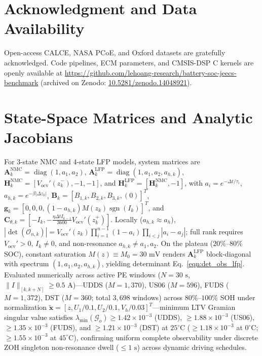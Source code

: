 \documentclass[preprint,12pt]{elsarticle}
\begin{document}
\section*{Acknowledgment and Data Availability}
{\sloppy Open-access CALCE, NASA PCoE, and Oxford datasets are gratefully acknowledged. Code pipelines, ECM parameters, and CMSIS-DSP C kernels are openly available at \url{https://github.com/lehoang-research/battery-soc-jeecs-benchmark} (archived on Zenodo: \href{https://doi.org/10.5281/zenodo.14048921}{10.5281/zenodo.14048921}).\par}

\appendix
\appendix

\section{State-Space Matrices and Analytic Jacobians\label{app:jacobians}}
For 3-state NMC and 4-state LFP models, system matrices are $\mathbf{A}_k^{\text{NMC}} = \operatorname{diag}(1, a_1, a_2)$, $\mathbf{A}_k^{\text{LFP}} = \operatorname{diag}(1, a_1, a_2, a_{h,k})$, $\mathbf{H}_k^{\text{NMC}} = [V_{\text{ocv}}'(\hat{z}_k^-), -1, -1]$, and $\mathbf{H}_k^{\text{LFP}} = [\mathbf{H}_k^{\text{NMC}}, -1]$, with $a_i = e^{-\Delta t/\tau_i}$, $a_{h,k} = e^{-\beta|\Delta z_k|}$, $\mathbf{B}_k = [B_{1,k}, B_{2,k}, B_{3,k}, (0)]^T$, $\mathbf{g}_k = [0, 0, 0, (1 - a_{h,k}) M(z_k) \operatorname{sgn}(I_k)]^T$, and $\mathbf{C}_{\theta,k} = [-I_k, -\tfrac{\eta \Delta t I_{k-1}}{3600} V_{\text{ocv}}'(\hat{z}_k^+)]$. Locally ($a_{h,k} \approx a_h$), $|\det(\mathcal{O}_{n,k})| = V_{\text{ocv}}'(z_k) \prod_{i=1}^{n-1}(1 - a_i) \prod_{i < j} |a_i - a_j|$; full rank requires $V_{\text{ocv}}' > 0$, $I_k \ne 0$, and non-resonance $a_{h,k} \ne a_1, a_2$. On the plateau ($20\%\text{--}80\%$ SOC), constant saturation $M(z) \equiv M_0 = 30\text{ mV}$ renders $\mathbf{A}_k^{\text{LFP}}$ block-diagonal with spectrum $(1, a_1, a_2, a_{h,k})$, yielding determinant Eq.~\eqref{eqn:det_obs_lfp}. Evaluated numerically across active PE windows ($N=30\text{ s}$, $\|I\|_{[k,k+N]} \ge 0.5\text{ A}$)—UDDS ($M = 1,370$), US06 ($M = 596$), FUDS ($M = 1,372$), DST ($M = 360$; total $3,698$ windows) across $80\%\text{--}100\%$ SOH under normalization $\tilde{\mathbf{x}} = [z, U_1/0.1, U_2/0.1, V_h/0.03]^T$—minimum LTV Gramian singular value satisfies $\lambda_{\min}(\mathcal{G}_o) \ge 1.42 \times 10^{-3}$ (UDDS), $\ge 1.88 \times 10^{-3}$ (US06), $\ge 1.35 \times 10^{-3}$ (FUDS), and $\ge 1.21 \times 10^{-3}$ (DST) at $25^\circ\text{C}$ ($\ge 1.18 \times 10^{-3}$ at $0^\circ\text{C}$; $\ge 1.55 \times 10^{-3}$ at $45^\circ\text{C}$), confirming uniform complete observability under discrete ZOH singleton non-resonance dwell ($\le 1\text{ s}$) across dynamic driving schedules.
\end{document}
